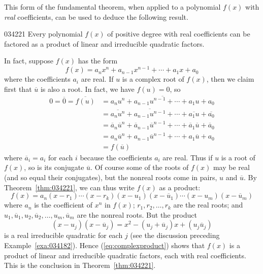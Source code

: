 \noindent This form of the fundamental theorem, when applied to a polynomial $f(x)$ with \textit{real} coefficients, can be used to deduce the following result.


\begin{theorem}{}{034221}
Every polynomial $f(x)$ of positive 
degree with real coefficients can be factored as a product of linear and
 irreducible quadratic factors.
\end{theorem}

\noindent In fact, suppose $f(x)$ has the form
\begin{equation*}
f(x) = a_nx^n + a_{n-1}x^{n-1} + \cdots + a_1x + a_0
\end{equation*}
where the coefficients $a_{i}$ are real. If $u$ is a complex root of $f(x)$, then we claim first that $\overline{u}$
 is also a root. In fact, we have $f(u) = 0$, so
\begin{align*}
0 = \overline{0} = \overline{f(u)} & = \overline{a_nu^n + a_{n-1}u^{n-1} + \cdots + a_1u + a_0 } \\
& = \overline{a_nu^n} + \overline{a_{n-1}u^{n-1}} + \cdots + \overline{a_1u} + \overline{a_0 } \\
& = \overline{a}_n\overline{u}^n + \overline{a}_{n-1}\overline{u}^{n-1} + \cdots + \overline{a}_1\overline{u} + \overline{a}_0 \\
& = a_n\overline{u}^n + a_{n-1}\overline{u}^{n-1} + \cdots + a_1\overline{u} + a_0 \\
&= f(\overline{u})
\end{align*}
where $\overline{a}_i = a_i$
 for each $i$ because the coefficients $a_{i}$ are real. Thus if $u$ is a root of $f(x)$, so is its conjugate $\overline{u}$. Of course some of the roots of $f(x)$ may be real (and so equal their conjugates), but the nonreal roots come in pairs, $u$ and $\overline{u}$. By Theorem~\ref{thm:034221}, we can thus write $f(x)$ as a product:
\begin{equation}\label{eq:complexproduct}
f(x) = a_n(x-r_1)\cdots(x-r_k)(x-u_1)(x-\overline{u}_1)\cdots (x-u_m)(x-\overline{u}_m)
\end{equation}
where $a_{n}$ is the coefficient of $x^{n}$ in $f(x)$; $r_{1}, r_{2}, \dots , r_{k}$ are the real roots; and $u_{1}, \overline{u}_{1}, u_{2}, \overline{u}_{2}, \dots , u_{m}, \overline{u}_{m}$ are the nonreal roots. But the product
\begin{equation*}
(x-u_j)(x-\overline{u}_j) = x^2 - (u_j + \overline{u}_j)x +(u_j \overline{u}_j)
\end{equation*}
is a real irreducible quadratic for each $j$ (see the discussion preceding Example~\ref{exa:034182}). Hence (\ref{eq:complexproduct}) shows that $f(x)$ is a product of linear and irreducible quadratic factors, each with real coefficients. This is the conclusion in Theorem~\ref{thm:034221}.


